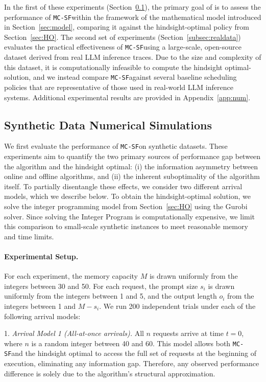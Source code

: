\documentclass[11pt, a4paper]{article}
\theoremstyle{plain}
\theoremstyle{definition}
\theoremstyle{remark}
\newcommand{\mcsdf}{\texttt{MC-SF}}
\begin{document}
In the first of these experiments (Section~\ref{subsec:synthetic}), the primary goal of  is to assess the performance of \mcsdf \text{ }within the framework of the mathematical model introduced in Section~\ref{sec:model}, comparing it against the hindsight-optimal policy from Section~\ref{sec:HO}.
The second set of experiments (Section~\ref{subsec:realdata}) 
evaluates the practical effectiveness of \mcsdf \text{ }using a large-scale, open-source dataset derived from real LLM inference traces. Due to the size and complexity of this dataset, it is computationally infeasible to compute the hindsight optimal-solution, and we instead compare \mcsdf \text{ }against several baseline scheduling policies that are representative of those used in real-world LLM inference systems. 
Additional experimental results are provided in Appendix~\ref{app:num}.



\subsection{Synthetic Data Numerical Simulations} \label{subsec:synthetic}


We first evaluate the performance of \mcsdf \text{ }on synthetic datasets. These experiments aim to quantify the two primary sources of performance gap between the algorithm and the hindsight optimal: (i) the information asymmetry between online and offline algorithms, and (ii) the inherent suboptimality of the algorithm itself. To partially disentangle these effects, we consider two different arrival models{, which we describe below}. To obtain the hindsight-optimal solution, we solve the integer programming model from Section~\ref{sec:HO} using the Gurobi solver. Since solving the Integer Program is computationally expensive, we limit this comparison to small-scale synthetic instances to meet reasonable memory and time limits.


\paragraph{Experimental Setup.} For each experiment, the memory capacity \( M \) is drawn uniformly from the integers between 30 and 50. For each request, the prompt size \( s_i \) is drawn uniformly from the integers between 1 and 5, and the output length \( o_i \) from the integers between 1 and \( M - s_i \).
We run 200 independent trials under each of the following arrival models:

1. \textit{Arrival Model 1 (All-at-once arrivals).} All \( n \) requests arrive at time \( t = 0 \), where \( n \) is a random integer between 40 and 60. This model allows both \mcsdf \text{ }and the hindsight optimal to access the full set of requests at the beginning of execution, eliminating any information gap. Therefore, any observed performance difference is solely due to the algorithm’s structural approximation.
    
\end{document}
